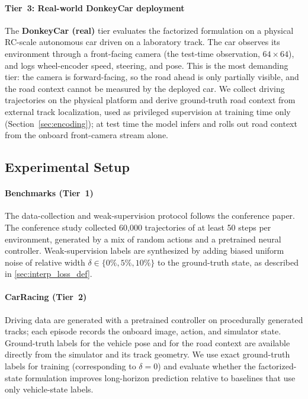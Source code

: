\documentclass[preprint,12pt]{elsarticle}
\begin{document}
\paragraph{Tier~3: Real-world DonkeyCar deployment}
The \textbf{DonkeyCar (real)} tier evaluates the factorized formulation on a
physical RC-scale autonomous car driven on a laboratory track.
The car observes its environment through a front-facing camera (the test-time
observation, $64 \times 64$), and logs wheel-encoder speed, steering, and pose.
This is the most demanding tier: the camera is forward-facing, so the road ahead
is only partially visible, and the road context cannot be measured by the deployed
car.
We collect driving trajectories on the physical platform and derive ground-truth
road context from external track localization, used as privileged supervision at
training time only (Section~\ref{sec:encoding}); at test time the model infers and
rolls out road context from the onboard front-camera stream alone.

\subsection{Experimental Setup}\label{sec:setup}

\paragraph{Benchmarks (Tier~1)}
The data-collection and weak-supervision protocol follows the conference paper.
The conference study collected 60{,}000 trajectories of at least 50 steps per environment,
generated by a mix of random actions and a pretrained neural controller.
Weak-supervision labels are synthesized by adding biased uniform noise of relative
width $\delta \in \{0\%, 5\%, 10\%\}$ to the ground-truth state, as described in
\ref{sec:interp_loss_def}.

\paragraph{CarRacing (Tier~2)}
Driving data are generated with a pretrained controller on procedurally generated
tracks; each episode records the onboard image, action, and simulator state.
Ground-truth labels for the vehicle pose and for the road context are available
directly from the simulator and its track geometry.
We use exact ground-truth labels for training (corresponding to $\delta = 0$) and
evaluate whether the factorized-state formulation improves long-horizon prediction
relative to baselines that use only vehicle-state labels.
\end{document}
